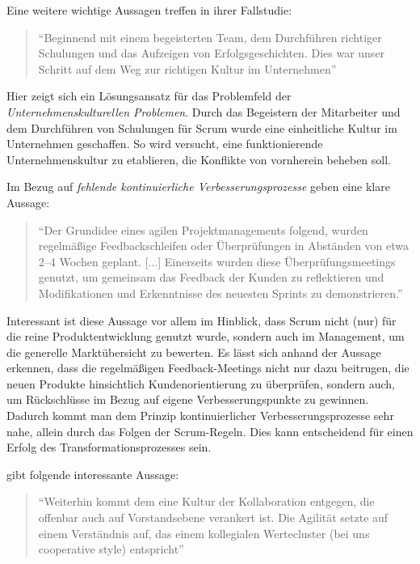 Eine weitere wichtige Aussagen treffen  in ihrer Fallstudie:

\begin{quote}
	``Beginnend mit einem begeisterten Team, dem Durchführen richtiger Schulungen und das Aufzeigen von Erfolgsgeschichten. Dies war unser Schritt auf dem Weg zur richtigen Kultur im Unternehmen'' \cite[S. 2]{anwar_agile_2016}
\end{quote}

Hier zeigt sich ein Lösungsansatz für das Problemfeld der \textit{Unternehmenskulturellen Problemen}. Durch das Begeistern der Mitarbeiter und dem Durchführen von Schulungen für Scrum wurde eine einheitliche Kultur im Unternehmen geschaffen. So wird versucht, eine funktionierende Unternehmenskultur zu etablieren, die Konflikte von vornherein beheben soll.

Im Bezug auf \textit{fehlende kontinuierliche Verbesserungsprozesse} geben  eine klare Aussage:

\begin{quote}
	``Der Grundidee eines agilen Projektmanagements folgend, wurden regelmäßige Feedbackschleifen oder Überprüfungen in Abständen von etwa 2–4 Wochen geplant. [...] Einerseits wurden diese Überprüfungsmeetings genutzt, um gemeinsam das Feedback der Kunden zu reflektieren und Modifikationen und Erkenntnisse des neuesten Sprints zu demonstrieren.'' \cite[S. 146]{urbach_digitalization_2018}
\end{quote}

Interessant ist diese Aussage vor allem im Hinblick, dass Scrum nicht (nur) für die reine Produktentwicklung genutzt wurde, sondern auch im Management, um die generelle Marktübersicht zu bewerten. Es lässt sich anhand der Aussage erkennen, dass die regelmäßigen Feedback-Meetings nicht nur dazu beitrugen, die neuen Produkte hinsichtlich Kundenorientierung zu überprüfen, sondern auch, um Rückschlüsse im Bezug auf eigene Verbesserungspunkte zu gewinnen. Dadurch kommt man dem Prinzip kontinuierlicher Verbesserungsprozesse sehr nahe, allein durch das Folgen der Scrum-Regeln. Dies kann entscheidend für einen Erfolg des Transformationsprozesses sein.

 gibt folgende interessante Aussage: 

\begin{quote}
	``Weiterhin kommt dem eine Kultur der Kollaboration entgegen, die offenbar auch auf Vorstandsebene verankert ist. Die Agilität setzte auf einem Verständnis auf, das einem kollegialen Wertecluster (bei uns cooperative style) entspricht'' \cite[S. 210]{hofert_agile_2018}
\end{quote}

